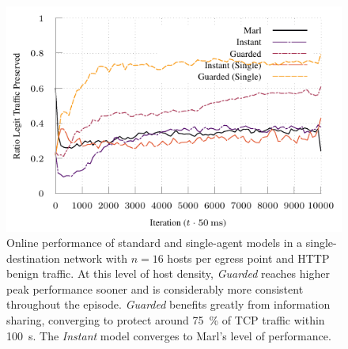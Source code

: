 \documentclass[10pt, times, comsoc]{IEEEtran}
\begin{document}
\begin{figure}
	\centering
	\includegraphics[width=0.95\linewidth]{../plots/tnsm-tcp-16-single}
	
	\caption{
		Online performance of standard and single-agent models in a single-destination network with $n=16$ hosts per egress point and HTTP benign traffic.
		At this level of host density, \emph{Guarded} reaches higher peak performance sooner and is considerably more consistent throughout the episode.
		\emph{Guarded} benefits greatly from information sharing, converging to protect around \SI{75}{\percent} of TCP traffic within \SI{100}{\second}.
		The \emph{Instant} model converges to Marl's level of performance.
		\label{fig:tcp-tree-16}
	}
\end{figure}

%	

%	
\end{document}
